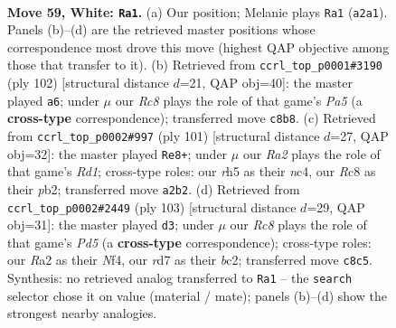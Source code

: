 \documentclass[11pt]{article}
\begin{document}
\clearpage

\begin{figure}[p]\centering
\begin{subfigure}{0.46\textwidth}\centering
\resizebox{\linewidth}{!}{%
\newchessgame
\chessboard[
  setfen={2R5/3r1pk1/8/p6r/4K3/1P6/R2p3P/8 w - - 0 59},
  showmover=false,
  pgfstyle=straightmove, color=movearrow, markmove={a2-a1}
]}
\caption{}
\end{subfigure}\hfill
\begin{subfigure}{0.46\textwidth}\centering
\resizebox{\linewidth}{!}{%
\newchessgame
\chessboard[
  setfen={8/8/1R3p2/P2k3p/3p1r1P/8/2K2P2/8 w - - 0 52},
  showmover=false,
  pgfstyle=straightmove, color=movearrow, markmove={a5-a6}
]}
\caption{}
\end{subfigure}
\\[4pt]
\begin{subfigure}{0.46\textwidth}\centering
\resizebox{\linewidth}{!}{%
\newchessgame
\chessboard[
  setfen={3r4/8/3P1k1p/p7/2N1KP2/8/PP4R1/3r4 b - - 0 51},
  showmover=false,
  pgfstyle=straightmove, color=movearrow, markmove={d8-e8}
]}
\caption{}
\end{subfigure}\hfill
\begin{subfigure}{0.46\textwidth}\centering
\resizebox{\linewidth}{!}{%
\newchessgame
\chessboard[
  setfen={1r6/4k3/2R3P1/8/2pp1n2/P7/KPB5/8 b - - 1 52},
  showmover=false,
  pgfstyle=straightmove, color=movearrow, markmove={d4-d3}
]}
\caption{}
\end{subfigure}
\caption{\textbf{Move 59, White: \texttt{Ra1}.} (a) Our position; Melanie plays \texttt{Ra1} (\texttt{a2a1}). Panels (b)--(d) are the retrieved master positions whose correspondence most drove this move (highest QAP objective among those that transfer to it). (b) Retrieved from \texttt{ccrl\_top\_p0001\#3190} (ply 102) [structural distance $d$=21, QAP obj=40]: the master played \texttt{a6}; under $\mu$ our \emph{Rc8} plays the role of that game's \emph{Pa5} (a \textbf{cross-type} correspondence); transferred move \texttt{c8b8}. (c) Retrieved from \texttt{ccrl\_top\_p0002\#997} (ply 101) [structural distance $d$=27, QAP obj=32]: the master played \texttt{Re8+}; under $\mu$ our \emph{Ra2} plays the role of that game's \emph{Rd1}; cross-type roles: our \emph{r}h5 as their \emph{n}c4, our \emph{R}c8 as their \emph{p}b2; transferred move \texttt{a2b2}. (d) Retrieved from \texttt{ccrl\_top\_p0002\#2449} (ply 103) [structural distance $d$=29, QAP obj=31]: the master played \texttt{d3}; under $\mu$ our \emph{Rc8} plays the role of that game's \emph{Pd5} (a \textbf{cross-type} correspondence); cross-type roles: our \emph{R}a2 as their \emph{N}f4, our \emph{r}d7 as their \emph{b}c2; transferred move \texttt{c8c5}. Synthesis: no retrieved analog transferred to \texttt{Ra1} -- the \texttt{search} selector chose it on value (material / mate); panels (b)--(d) show the strongest nearby analogies.}
\label{fig:thought-m116}
\end{figure}
\end{document}
